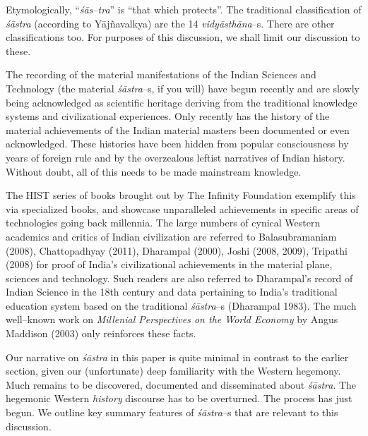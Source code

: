 Etymologically, “\textit{śās–tra}” is “that which protects”. The traditional classification of \textit{śāstra} (according to Yājñavalkya) are the 14 \textit{vidyāsthāna}–s. There are other classifications too. For purposes of this discussion, we shall limit our discussion to these.

The recording of the material manifestations of the Indian Sciences and Technology (the material \textit{śāstra}–s, if you will) have begun recently and are slowly being acknowledged as scientific heritage deriving from the traditional knowledge systems and civilizational experiences. Only recently has the history of the material achievements of the Indian material masters been documented or even acknowledged. These histories have been hidden from popular consciousness by years of foreign rule and by the overzealous leftist narratives of Indian history. Without doubt, all of this needs to be made mainstream knowledge.

The HIST series of books brought out by The Infinity Foundation exemplify this via specialized books, and showcase unparalleled achievements in specific areas of technologies going back millennia. The large numbers of cynical Western academics and critics of Indian civilization are referred to Balasubramaniam (2008), Chattopadhyay (2011), Dharampal (2000), Joshi (2008, 2009), Tripathi (2008) for proof of India’s civilizational achievements in the material plane, sciences and technology. Such readers are also referred to Dharampal’s record of Indian Science in the 18th century and data pertaining to India’s traditional education system based on the traditional \textit{śāstra}–s (Dharampal 1983). The much well–known work on \textit{Millenial Perspectives on the World Economy} by Angus Maddison (2003) only reinforces these facts.

Our narrative on \textit{śāstra} in this paper is quite minimal in contrast to the earlier section, given our (unfortunate) deep familiarity with the Western hegemony. Much remains to be discovered, documented and disseminated about \textit{śāstra}. The hegemonic Western \textit{history} discourse has to be overturned. The process has just begun. We outline key summary features of \textit{śāstra}–s that are relevant to this discussion.


